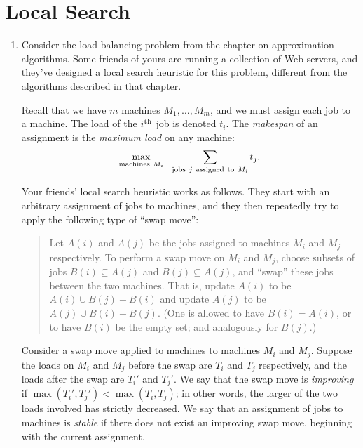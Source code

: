 \documentclass[12pt]{article}
\begin{document}
\section{Local Search}


\begin{enumerate}


\item 

Consider the load balancing problem from the chapter on approximation
algorithms.
Some friends of yours are running a collection of Web servers,
and they've designed a local search heuristic
for this problem, different from the algorithms described in that chapter.

Recall that we have $m$ machines $M_1, \ldots, M_m$,
and we must assign each job to a machine.
The load of the $i^{\rm th}$ job is denoted $t_i$.
The {\em makespan} of an assignment
is the {\em maximum load} on any machine:
$$\max_{{\rm machines}~M_i} ~~ \sum_{{\rm jobs}~j~{\rm assigned~to}~M_i} t_j.$$

Your friends' local search heuristic works as follows.
They start with an arbitrary assignment
of jobs to machines, and they then repeatedly try to apply the
following type of ``swap move'':
\begin{quote}
Let $A(i)$ and $A(j)$ be the jobs assigned to machines
$M_i$ and $M_j$ respectively.
To perform a swap move on $M_i$ and $M_j$,
choose subsets of jobs $B(i) \subseteq A(j)$
and $B(j) \subseteq A(j)$,
and ``swap'' these jobs between the two machines.
That is, update $A(i)$ to be $A(i) \cup B(j) - B(i)$
and update $A(j)$ to be $A(j) \cup B(i) - B(j)$.
(One is allowed to have $B(i) = A(i)$, or to have $B(i)$
be the empty set; and analogously for $B(j)$.)
\end{quote}

Consider a swap move applied to machines to machines $M_i$ and $M_j$.
Suppose the loads on $M_i$ and $M_j$ before the swap
are $T_i$ and $T_j$ respectively,
and the loads after the swap are $T_i'$ and $T_j'$.
We say that the swap move is {\em improving} if
$\max(T_i', T_j') < \max(T_i, T_j)$;
in other words, the larger of the two loads involved
has strictly decreased.
We say that an assignment of jobs to machines is
{\em stable} if there does not exist an improving swap move,
beginning with the current assignment.


\end{enumerate}
\end{document}
